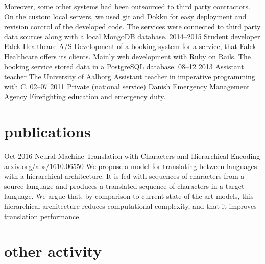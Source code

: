 \documentclass[]{friggeri-cv}
\begin{document}
\begin{entrylist}
{      Moreover, some other systems had been outsourced to third party contractors.
      On the custom local servers, we used git and Dokku for easy deployment and revision control of the developed code.
      The services were connected to third party data sources along with a local MongoDB database.
    }
  \entry
    {2014--2015}
    {Student developer}
    {Falck Healthcare A/S}
    {
      Development of a booking system for a service, that Falck Healthcare offers its clients. 
      Mainly web development with Ruby on Rails. The booking service stored data in a PostgreSQL database.
    }
  \entry
    {08–12 2013}
    {Assistant teacher}
    {The University of Aalborg}
    {Assistant teacher in imperative programming with C.}
  \entry
    {02–07 2011}
    {Private (national service)}
    {Danish Emergency Management Agency}
    {Firefighting education and emergency duty.}
\end{entrylist}

\newpage

\section{publications}

\begin{entrylist}
  \entry
    {Oct 2016}
    {Neural Machine Translation with Characters and Hierarchical Encoding\\}
    {\href{https://arxiv.org/abs/1610.06550}{arxiv.org/abs/1610.06550}}
    {We propose a model for translating between languages with a hierarchical architecture. It is fed with sequences of 
    characters from a source language and produces a translated sequence of characters in a target language.
    We argue that, by comparison to current state of the art models, this hierarchical architecture reduces computational 
    complexity, and that it improves translation performance.}
\end{entrylist}

\section{other activity}
\end{document}
